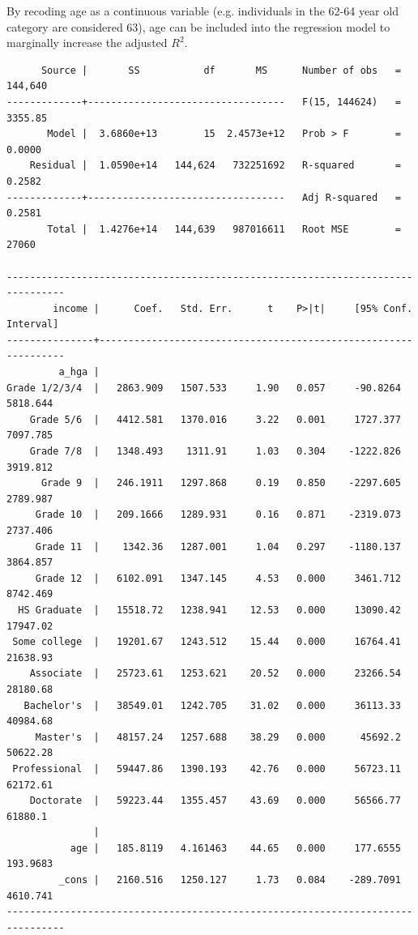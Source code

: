 \documentclass{article}
\begin{document}
By recoding age as a continuous variable (e.g. individuals in the 62-64 year old category are considered 63), age can be included into the regression model to marginally increase the adjusted $R^2$.

\begin{verbatim}
      Source |       SS           df       MS      Number of obs   =   144,640
-------------+----------------------------------   F(15, 144624)   =   3355.85
       Model |  3.6860e+13        15  2.4573e+12   Prob > F        =    0.0000
    Residual |  1.0590e+14   144,624   732251692   R-squared       =    0.2582
-------------+----------------------------------   Adj R-squared   =    0.2581
       Total |  1.4276e+14   144,639   987016611   Root MSE        =     27060

--------------------------------------------------------------------------------
        income |      Coef.   Std. Err.      t    P>|t|     [95% Conf. Interval]
---------------+----------------------------------------------------------------
         a_hga |
Grade 1/2/3/4  |   2863.909   1507.533     1.90   0.057     -90.8264    5818.644
    Grade 5/6  |   4412.581   1370.016     3.22   0.001     1727.377    7097.785
    Grade 7/8  |   1348.493    1311.91     1.03   0.304    -1222.826    3919.812
      Grade 9  |   246.1911   1297.868     0.19   0.850    -2297.605    2789.987
     Grade 10  |   209.1666   1289.931     0.16   0.871    -2319.073    2737.406
     Grade 11  |    1342.36   1287.001     1.04   0.297    -1180.137    3864.857
     Grade 12  |   6102.091   1347.145     4.53   0.000     3461.712    8742.469
  HS Graduate  |   15518.72   1238.941    12.53   0.000     13090.42    17947.02
 Some college  |   19201.67   1243.512    15.44   0.000     16764.41    21638.93
    Associate  |   25723.61   1253.621    20.52   0.000     23266.54    28180.68
   Bachelor's  |   38549.01   1242.705    31.02   0.000     36113.33    40984.68
     Master's  |   48157.24   1257.688    38.29   0.000      45692.2    50622.28
 Professional  |   59447.86   1390.193    42.76   0.000     56723.11    62172.61
    Doctorate  |   59223.44   1355.457    43.69   0.000     56566.77     61880.1
               |
           age |   185.8119   4.161463    44.65   0.000     177.6555    193.9683
         _cons |   2160.516   1250.127     1.73   0.084    -289.7091    4610.741
--------------------------------------------------------------------------------
\end{verbatim}
\end{document}
